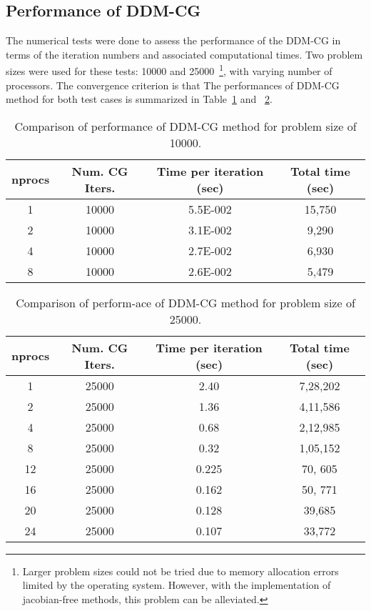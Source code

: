\documentclass[12pt]{report}
\begin{document}
\subsection{Performance of DDM-CG}

The numerical tests were done to assess the performance of the DDM-CG
in terms of the iteration numbers and associated computational times.
Two problem sizes were used for these tests: 10000 and 25000~\footnote{Larger problem sizes could not be tried due to memory allocation
errors limited by the operating system. However, with the
implementation of jacobian-free methods, this problem can be alleviated.
}, with
varying number of processors.  The convergence criterion is that
The performances of DDM-CG method for both test cases is summarized in
Table~\ref{tab:summary-10000} and ~\ref{tab:summary-25000}.

\begin{table}[H]
  \caption{Comparison of performance of DDM-CG method for problem size of 10000.}
  \centering
  \begin{tabular}{c|c|c|c}
    \toprule
    nprocs   & Num. CG Iters.   & Time per iteration (sec) & Total time (sec) \\
    \midrule
    1 & 10000 & 5.5E-002 & 15,750 \\ 
    2 & 10000 & 3.1E-002 & 9,290 \\
    4 & 10000 & 2.7E-002 & 6,930 \\
    8 & 10000 & 2.6E-002 & 5,479 \\
    \bottomrule
  \end{tabular}
  \label{tab:summary-10000}
\end{table}

\begin{table}[H]
  \caption{Comparison of perform-ace of DDM-CG method for problem size of 25000.}
  \centering
  \begin{tabular}{c|c|c|c}
    \toprule
    nprocs   & Num. CG Iters.   & Time per iteration (sec) & Total time (sec) \\
    \midrule
    1 & 25000 & 2.40 & 7,28,202 \\ 
    2 & 25000 & 1.36 & 4,11,586 \\
    4 & 25000 & 0.68 & 2,12,985 \\
    8 & 25000 & 0.32 & 1,05,152 \\
    12 & 25000 & 0.225 & 70, 605 \\
    16 & 25000 & 0.162 &50, 771 \\
    20 & 25000 & 0.128 & 39,685  \\
    24 & 25000 & 0.107 & 33,772  \\
    \bottomrule
  \end{tabular}
  \label{tab:summary-25000}
\end{table}
\end{document}
